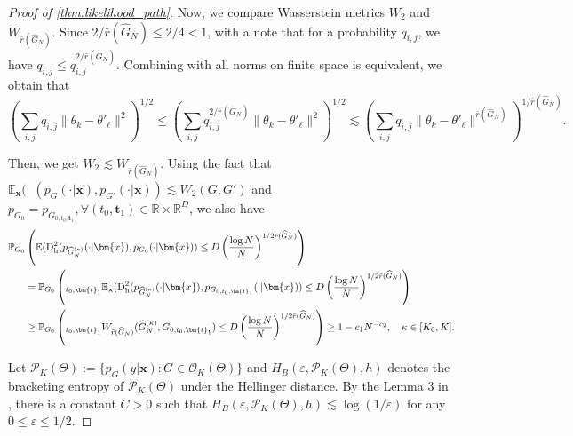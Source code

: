 \documentclass[twoside]{article}
\DeclareMathOperator*{\hels}{D_{h}^2}
\let\inf\relax
\DeclareMathOperator*\inf{\vphantom{p}inf}
\theoremstyle{plain}
\theoremstyle{definition}
\theoremstyle{plain}
\def\rvx{{\mathbf{x}}}
\def\vt{{\bm{t}}}
\def\vx{{\bm{x}}}
\newcommand{\bbE}{\mathbb{E}}
\newcommand{\norm}[1]{\|#1\|}
\begin{document}
\begin{proof}[Proof of \cref{thm:likelihood_path}]
    Now, we compare Wasserstein metrics $W_2$ and $W_{\bar{r}(\widehat{G}_N)}$. Since $2/\bar{r}(\widehat{G}_N) \leq 2/4 < 1$, with a note that for a probability $q_{i, j}$, we have $q_{i, j} \leq q_{i, j}^{2/ \bar{r}(\widehat{G}_N)}$. Combining with all norms on finite space is equivalent, we obtain that $$\left( \sum_{i, j} q_{i, j} \norm{\theta_k - \theta'_{\ell}}^2 \right)^{1/2} \leq \left( \sum_{i, j} q_{i, j}^{2/ \bar{r}(\widehat{G}_N)} \norm{\theta_k - \theta'_{\ell}}^2 \right)^{1/2} \lesssim \left( \sum_{i, j} q_{i, j} \norm{\theta_k - \theta'_{\ell}}^{\bar{r}(\widehat{G}_N)} \right)^{1/\bar{r}(\widehat{G}_N)}.$$

    Then, we get $W_2 \lesssim W_{\bar{r}(\widehat{G}_N)}$. Using the fact that $\bbE_{\rvx} (\hels(p_{G} (\cdot | \vx), p_{G'} (\cdot | \vx)) \lesssim W_2 (G, G')$ and $p_{G_0} = p_{G_{0, t_0, \vt_1}}, \forall (t_0, \vt_1) \in \mathbb{R} \times \mathbb{R}^D$, we also have 
    \begin{align*}
        \mathbb{P}_{G_0} &\left( \mathbb{E} (\hels(p_{\widehat{G}_N^{(\kappa)}} (\cdot | \vx), p_{G_{0}} (\cdot | \vx)) \leq D \left( \frac{\log N}{N} \right)^{1/2\bar{r}(\widehat{G}_N)} \right) \\
        &= \mathbb{P}_{G_0} \left( \inf_{t_0, \vt_1} \bbE_{\rvx} (\hels(p_{\widehat{G}_N^{(\kappa)}} (\cdot | \vx), p_{G_{0, t_0, \vt_1}} (\cdot | \vx)) \leq D \left( \frac{\log N}{N} \right)^{1/2\bar{r}(\widehat{G}_N)} \right) \\
        &\geq \mathbb{P}_{G_0} \left( \inf_{t_0, \vt_1} W_{\bar{r}(\widehat{G}_N)} (\widehat{G}_N^{(\kappa)}, G_{0, t_0, \vt_1}) \leq D \left( \frac{\log N}{N} \right)^{1/2\bar{r}(\widehat{G}_N)} \right) \geq 1 - c_1 N^{-c_2}, \quad \kappa \in [K_0, K].
    \end{align*}

    Let $\mathcal{P}_K (\Theta) := \{ p_G (y | \vx) : G \in \mathcal{O}_K (\Theta) \}$ and $H_B (\varepsilon, \mathcal{P}_K (\Theta), h)$ denotes the bracketing entropy of $\mathcal{P}_K (\Theta)$ under the Hellinger distance. By the Lemma 3 in \cite{nguyen_demystifying_2023}, there is a constant $C > 0$ such that $H_B (\varepsilon, \mathcal{P}_K (\Theta), h) \lesssim \log(1/\varepsilon)$ for any $0 \leq \varepsilon \leq 1/2$.


\end{proof}
\end{document}
